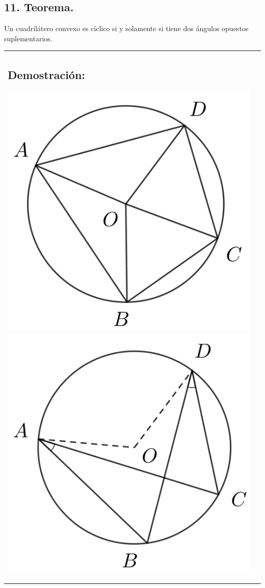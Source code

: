 \documentclass[12pt,a4paper]{article}
\begin{document}
\subsection*{11. Teorema.}
Un cuadrilátero convexo es cíclico si y solamente si tiene dos ángulos opuestos suplementarios.\\
\begin{tabular}{p{15.9 cm} p{1cm}}
\subsection*{Demostración:}
\begin{center}
\includegraphics[scale=0.6]{Imagenes/ciclico.png} 
\includegraphics[scale=0.6]{Imagenes/ciclico1.png} 

\end{center}
\end{tabular}
\end{document}
